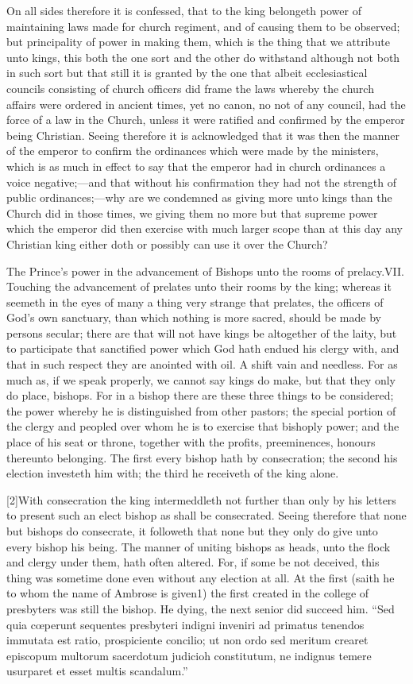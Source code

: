 On all sides therefore it is confessed, that to the king belongeth power of maintaining laws made for church regiment,  and of causing them to be observed; but principality of power in making them, which is the thing that we attribute unto kings, this both the one sort and the other do withstand although not both in such sort but that still it is granted by the one that albeit ecclesiastical councils consisting of church officers did frame the laws whereby the church affairs were ordered in ancient times, yet no canon, no not of any council, had the force of a law in the Church, unless it were ratified and confirmed by the emperor being Christian. Seeing therefore it is acknowledged that it was then the manner of the emperor to confirm the ordinances which were made by the ministers, which is as much in effect to say that the emperor  had in church ordinances a voice negative;—and that without his confirmation they had not the strength of public ordinances;—why are we condemned as giving more unto kings than the Church did in those times, we giving them no more but that supreme power which the emperor did then exercise with much larger scope than at this day any Christian king either doth or possibly can use it over the Church?

The Prince’s power in the advancement of Bishops unto the rooms of prelacy.VII. Touching the advancement of prelates unto their rooms by the king; whereas it seemeth in the eyes of many a thing very strange that prelates, the officers of God’s own sanctuary, than which nothing is more sacred, should be made by persons secular; there are that will not have kings be altogether of the laity, but to participate that sanctified power which God hath endued his clergy with, and that in such respect they are anointed with oil. A shift vain and needless. For as much as, if we speak properly, we cannot say kings do make, but that they only do place, bishops. For in a bishop there are these three things to be considered; the power whereby he is distinguished from other pastors; the special portion of the clergy and peopled over whom he is to exercise that bishoply power; and the place of his seat or throne, together with the profits, preeminences, honours thereunto belonging. The first every bishop hath by consecration; the second his election investeth him with; the third he receiveth of the king alone.

[2]With consecration the king intermeddleth not further than only by his letters to present such an elect bishop as shall be consecrated. Seeing therefore that none but bishops do consecrate, it followeth that none but they only do give unto every bishop his being. The manner of uniting bishops as heads, unto the flock and clergy under them, hath often  altered. For, if some be not deceived, this thing was sometime done even without any election at all. At the first (saith he to whom the name of Ambrose is given1) the first created in the college of presbyters was still the bishop. He dying, the next senior did succeed him. “Sed quia cœperunt sequentes presbyteri indigni inveniri ad primatus tenendos immutata est ratio, prospiciente concilio; ut non ordo sed meritum crearet episcopum multorum sacerdotum judicioh constitutum, ne indignus temere usurparet et esset multis scandalum.”

